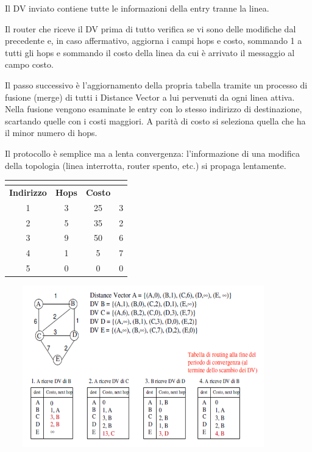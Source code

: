             Il DV inviato contiene tutte le informazioni della entry tranne la linea.

            Il router che riceve il DV prima di tutto verifica se vi sono delle modifiche dal precedente e, in caso affermativo, aggiorna i campi hops e costo, sommando 1 a tutti gli hops e sommando il costo della linea da cui è arrivato il messaggio al campo costo.

            Il passo successivo è l'aggiornamento della propria tabella tramite un processo di fusione (merge) di tutti i Distance Vector a lui pervenuti da ogni linea attiva. Nella fusione vengono esaminate le entry con lo stesso indirizzo di destinazione, scartando quelle con i costi maggiori. A parità di costo si seleziona quella che ha il minor numero di hops.

            Il protocollo è semplice ma a lenta convergenza: l'informazione di una modifica della topologia (linea interrotta, router spento, etc.) si propaga lentamente.

            \begin{table}[h]
                \centering
                \begin{tabular}{|c|c|c|c}
                \cline{1-3}
                \multicolumn{3}{|c|}{\cellcolor[HTML]{000000}{\color[HTML]{EFEFEF} \textbf{Distance Vector}}} & \multicolumn{1}{l}{} \\ \hline
                \rowcolor[HTML]{000000} 
                {\color[HTML]{EFEFEF} \textbf{Indirizzo}} & {\color[HTML]{EFEFEF} \textbf{Hops}} & {\color[HTML]{EFEFEF} \textbf{Costo}} & \multicolumn{1}{c|}{\cellcolor[HTML]{000000}{\color[HTML]{EFEFEF} \textbf{Linea}}} \\ \hline
                1 & 3 & 25 & \multicolumn{1}{c|}{3} \\ \hline
                2 & 5 & 35 & \multicolumn{1}{c|}{2} \\ \hline
                3 & 9 & 50 & \multicolumn{1}{c|}{6} \\ \hline
                4 & 1 & 5 & \multicolumn{1}{c|}{7} \\ \hline
                5 & 0 & 0 & \multicolumn{1}{c|}{0} \\ \hline
                \end{tabular}
            \end{table}

            \begin{center}
                \includegraphics[height=7cm,width=12cm]{chapters/4/assets/schema_s.png}
            \end{center}

